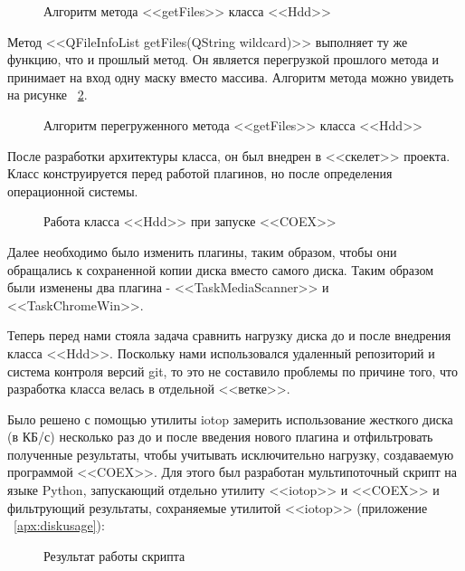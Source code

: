 \begin{figure}[h!]
\caption{ Алгоритм метода <<getFiles>> класса <<Hdd>> }
\label{bok_9:bok_9}
\end{figure}

Метод <<QFileInfoList getFiles(QString wildcard)>> выполняет ту же функцию, что и прошлый метод. Он является перегрузкой прошлого метода и принимает на вход одну маску вместо массива. Алгоритм метода можно увидеть на рисунке ~\ref{bok_8:bok_8}.

\begin{figure}[h!]
\caption{ Алгоритм перегруженного метода <<getFiles>> класса <<Hdd>> }
\label{bok_8:bok_8}
\end{figure}

После разработки архитектуры класса, он был внедрен в <<скелет>> проекта. Класс конструируется перед работой плагинов, но после определения операционной системы.

\begin{figure}[h!]
\caption{ Работа класса <<Hdd>> при запуске <<COEX>> }
\label{bok_3:bok_3}
\end{figure}

Далее необходимо было изменить плагины, таким образом, чтобы они обращались к сохраненной копии диска вместо самого диска. Таким образом были изменены два плагина - <<TaskMediaScanner>> и <<TaskChromeWin>>.

Теперь перед нами стояла задача сравнить нагрузку диска до и после внедрения класса <<Hdd>>. Поскольку нами использовался удаленный репозиторий и система контроля версий git, то это не составило проблемы по причине того, что разработка класса велась в отдельной <<ветке>>.

Было решено с помощью утилиты iotop замерить использование жесткого диска (в КБ/с) несколько раз до и после введения нового плагина и отфильтровать полученные результаты, чтобы учитывать исключительно нагрузку, создаваемую программой <<COEX>>. Для этого был разработан мультипоточный скрипт на языке Python, запускающий отдельно утилиту <<iotop>> и <<COEX>> и фильтрующий результаты, сохраняемые утилитой <<iotop>> (приложение ~\ref{apx:diskusage}):

\begin{figure}[h!]
\caption{ Результат работы скрипта }
\label{bok_4:bok_4}
\end{figure}

